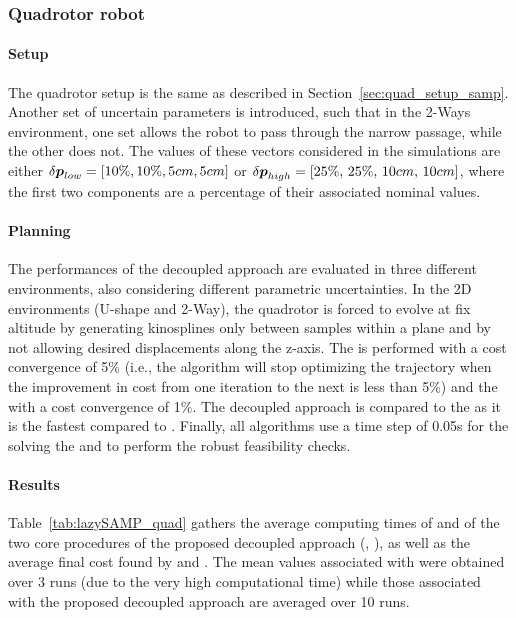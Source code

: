 \subsubsection{Quadrotor robot}

\paragraph{Setup}

The quadrotor setup is the same as described in Section~\ref{sec:quad_setup_samp}.
Another set of uncertain parameters is introduced, such that in the 2-Ways environment, one set allows the robot to pass through the narrow passage, while the other does not.
The values of these vectors considered in the simulations are either $\delta\boldsymbol{p}_{low} = [10\% , 10\% ,  5cm , 5cm]$ or $\delta\boldsymbol{p}_{high} = [25\%, \, 25\%, \, 10cm, \, 10cm]$, where the first two components are a percentage of their associated nominal values. 

\paragraph{Planning}

The performances of the decoupled approach are evaluated in three different environments, also considering different parametric uncertainties.
In the 2D environments (U-shape and 2-Way), the quadrotor is forced to evolve at fix altitude by generating kinosplines only between samples within a plane and by not allowing desired displacements along the z-axis.
The  is performed with a cost convergence of 5\% (i.e., the algorithm will stop optimizing the trajectory when the improvement in cost from one iteration to the next is less than 5\%) and the  with a cost convergence of 1\%.
The decoupled approach is compared to the  as it is the fastest compared to .
Finally, all algorithms use a time step of 0.05s for the solving the  and to perform the robust feasibility checks.

\paragraph{Results}

Table~\ref{tab:lazySAMP_quad} gathers the average computing times of  and of the two core procedures of the proposed decoupled approach (, ), as well as the average final cost found by  and . 
The mean values associated with  were obtained over 3 runs (due to the very high computational time) while those associated with the proposed decoupled approach are averaged over 10 runs.

